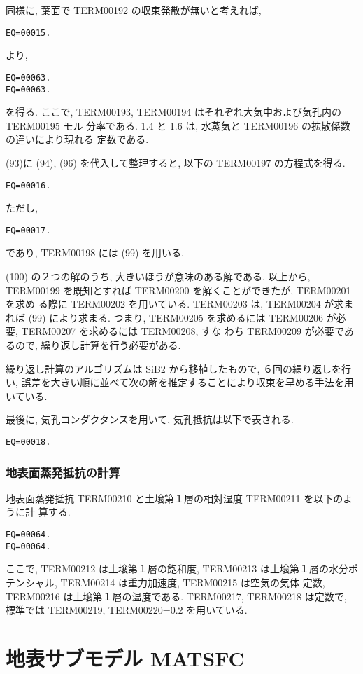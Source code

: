 同様に, 葉面で TERM00192 の収束発散が無いと考えれば,
\begin{verbatim}
EQ=00015.
\end{verbatim}
より,
\begin{verbatim}
EQ=00063.
EQ=00063.
\end{verbatim}
を得る. ここで, TERM00193, TERM00194 はそれぞれ大気中および気孔内の TERM00195 モル
分率である. 1.4 と 1.6 は, 水蒸気と TERM00196 の拡散係数の違いにより現れる
定数である.

(93)に (94), (96)
を代入して整理すると, 以下の TERM00197 の方程式を得る.
\begin{verbatim}
EQ=00016.
\end{verbatim}
ただし,
\begin{verbatim}
EQ=00017.
\end{verbatim}
であり, TERM00198 には (99) を用いる.

(100) の２つの解のうち, 大きいほうが意味のある解である.
以上から, TERM00199 を既知とすれば TERM00200 を解くことができたが, TERM00201 を求め
る際に TERM00202 を用いている. TERM00203 は, TERM00204 が求まれば (99)
により求まる.
つまり, TERM00205 を求めるには TERM00206 が必要, TERM00207 を求めるには TERM00208, すな
わち TERM00209 が必要であるので, 繰り返し計算を行う必要がある.

繰り返し計算のアルゴリズムは SiB2 から移植したもので, ６回の繰り返しを行
い, 誤差を大きい順に並べて次の解を推定することにより収束を早める手法を用
いている.

最後に, 気孔コンダクタンスを用いて, 気孔抵抗は以下で表される.
\begin{verbatim}
EQ=00018.
\end{verbatim}

\subsubsection{地表面蒸発抵抗の計算}

地表面蒸発抵抗 TERM00210 と土壌第１層の相対湿度 TERM00211 を以下のように計
算する.
\begin{verbatim}
EQ=00064.
EQ=00064.
\end{verbatim}
ここで, TERM00212 は土壌第１層の飽和度, TERM00213
は土壌第１層の水分ポテンシャル, TERM00214 は重力加速度, TERM00215 は空気の気体
定数, TERM00216 は土壌第１層の温度である.
TERM00217, TERM00218 は定数で, 標準では TERM00219, TERM00220=0.2 を用いている.

\section{地表サブモデル MATSFC}


